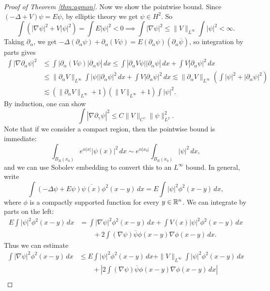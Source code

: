 \begin{proof}[Proof of Theorem \ref{thm:agmon}]
  Now we show the pointwise bound. Since
  $(-\Delta + V) \psi = E \psi$, by elliptic
  theory we get $\psi \in H^2$. So
  \[
    \int (|\nabla \psi|^2 + V|\psi|^2)
    = \int E |\psi|^2 < 0
    \implies \int |\nabla \psi|^2 \le \|V\|_{L^\infty}
    \int |\psi|^2 < \infty.
  \]
  Taking $\partial_\alpha$, we get
  $-\Delta (\partial_\alpha \psi) + \partial_\alpha(V \psi) = E(\partial_\alpha \psi)(\partial_{\alpha} \overline{\psi})$, so
  integration by parts gives
  \begin{align*}
    \int |\nabla \partial_\alpha \psi|^2
    &\le \int |\partial_\alpha (V\psi) |\partial_\alpha \psi|\, dx
    \le \int |\partial_\alpha V\psi| |\partial_\alpha \psi|\, dx
    + \int V|\partial_\alpha \psi|^2\, dx \\
    &\le \|\partial_\alpha V\|_{L^\infty}
    \int |\psi| |\partial_\alpha \psi|^2\, dx
    + \int V |\partial_\alpha \psi|^2\, dx
    \lesssim \|\partial_\alpha V\|_{L^\infty} \left(\int |\psi|^2 + |\partial_\alpha \psi|^2\right) \\
    &\lesssim (\|\partial_\alpha V\|_{L^\infty} + 1) (\|V\|_{L^\infty} + 1) \int |\psi|^2.
  \end{align*}
  By induction, one can show
  \[
    \int |\nabla \partial_\gamma \psi|^2
    \le C \|V\|_{C^\gamma} \|\psi\|_{L^2}^2.
  \]
  Note that if we consider a compact region, then
  the pointwise bound is immediate:
  \[
    \int_{B_R(x_0)} e^{\alpha |x|} |\psi(x)|^2\, dx
    \sim e^{\alpha |x_0|} \int_{B_R(x_0)} |\psi|^2\, dx,
  \]
  and we can use Sobolev embedding to convert this
  to an $L^\infty$ bound.
  In general, write
  \[
    \int (-\Delta \psi + E\psi) \overline{\psi(x)} \phi^2(x - y)\, dx
    = E \int |\psi|^2 \phi^2(x - y)\, dx,
  \]
  where $\phi$ is a compactly supported function for
  every $y \in \mathbb{R}^n$. We can integrate by parts
  on the left:
  \begin{align*}
    E \int |\psi|^2 \phi^2(x - y)\, dx
    &= \int |\nabla \psi|^2 \phi^2(x - y)\, dx
    + \int V(x) |\psi|^2 \phi^2(x - y)\, dx \\
    &\quad \quad + 2 \int (\nabla \psi) \overline{\psi} \phi(x - y) \nabla \phi(x - y)\, dx.
  \end{align*}
  Thus we can estimate
  \begin{align*}
    \int |\nabla \psi|^2 \phi^2(x - y)\, dx
    &\le E \int |\psi|^2 \phi^2(x - y)\, dx
    + \|V\|_{L^\infty} \int |\psi|^2 \phi^2(x - y)\, dx \\
    &\quad \quad + \left|2 \int (\nabla \psi) \overline{\psi} \phi(x - y) \nabla \phi(x - y)\, dx\right| \\

\end{align*}
\end{proof}

